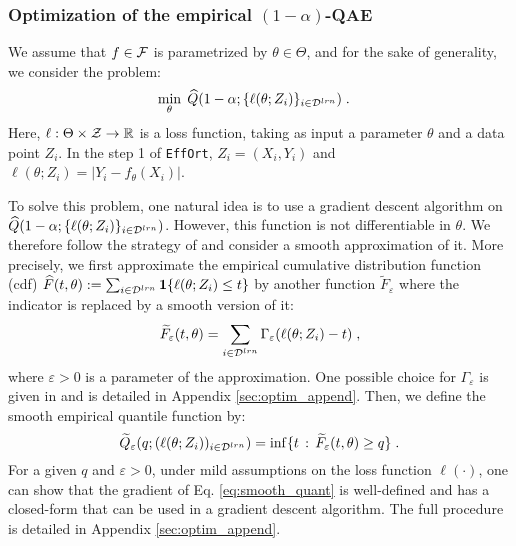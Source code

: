 \subsubsection{Optimization of the empirical $(1-\alpha)$-QAE}\label{sec:optim_emp_QAE}

We assume that $f\in\mathcal{F}$ is parametrized by $\theta \in\Theta$, and for the sake of generality, we consider the problem: 
\begin{align} \label{eq:optim_quantile}
	&\min_{\theta} \; \widehat{Q}(1-\alpha;\{\ell(\theta;Z_i)\}_{i\in{\cal D}^{lrn}}) \; .
\end{align}
%
Here, $\ell:\Theta\times{\cal Z}\rightarrow{\mathbb{R}}$ is a loss function, taking as input a parameter $\theta$ and a data point $Z_i$. In the step 1 of \texttt{EffOrt}, $Z_i=(X_i,Y_i)$ and $\ell(\theta;Z_i)=|Y_i-f_\theta(X_i)|$.

To solve this problem, one natural idea is to use a gradient descent algorithm on $\widehat{Q}(1-\alpha;\{\ell(\theta;Z_i)\}_{i\in{\cal D}^{lrn}})$. However, this function is not differentiable in $\theta$. We therefore follow the strategy of \citet{pena2020solving} and consider a smooth approximation of it. More precisely, we first approximate the empirical cumulative distribution function (cdf) $\widehat{F}(t, \theta) := \sum_{i\in{\cal D}^{lrn}} \mathbf{1}\{ \ell(\theta;Z_i) \leq t\}$ by another function $\widetilde{F}_{\varepsilon}$ where the indicator is replaced by a smooth version of it:
%
\begin{align*}
	\widetilde{F}_{\varepsilon}(t, \theta) = \sum_{i\in{\cal D}^{lrn}} \Gamma_{\varepsilon}(\ell(\theta;Z_i) - t) \; ,
\end{align*}
%
where $\varepsilon > 0$ is a parameter of the approximation. One possible choice for $\Gamma_{\varepsilon}$ is given in \citet[Eq. (2.6)]{pena2020solving} and is detailed in Appendix \ref{sec:optim_append}. Then, we define the smooth empirical quantile function by:
%
\begin{equation}\label{eq:smooth_quant}
	\widetilde{Q}_{\varepsilon}(q; (\ell(\theta;Z_i))_{i\in{\cal D}^{lrn}}) = \inf \{t \,:\, \widetilde{F}_{\varepsilon}(t, \theta) \geq q \} \; .
\end{equation}
%
For a given $q$ and $\varepsilon > 0$, under mild assumptions on the loss function $\ell(\cdot)$, one can show that the gradient of Eq.  \eqref{eq:smooth_quant} is well-defined and has a closed-form that can be used in a gradient descent algorithm. The full procedure is detailed in Appendix \ref{sec:optim_append}.

